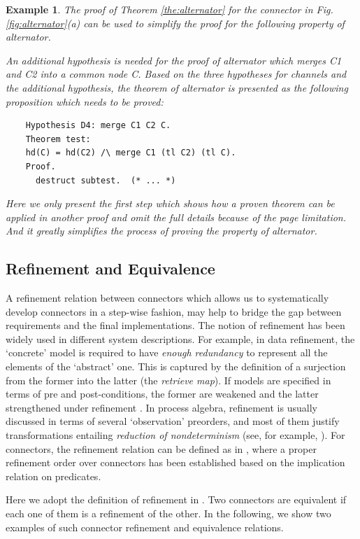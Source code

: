 \documentclass[3p,times]{elsarticle}
\newtheorem{example}{Example}[section]
\begin{document}
\begin{example}
The proof of Theorem \ref{the:alternator} for the connector in Fig. \ref{fig:alternator}(a) can be used to simplify the proof for the following
property of alternator.

An additional hypothesis is needed for the proof of alternator which merges \emph{C1} and \emph{C2} into a common node \emph{C}. Based on the three
hypotheses for channels and the additional hypothesis, the theorem of alternator is presented as the following proposition which needs to be proved:
\begin{verbatim}
    Hypothesis D4: merge C1 C2 C.
    Theorem test:
    hd(C) = hd(C2) /\ merge C1 (tl C2) (tl C).
    Proof.
      destruct subtest.  (* ... *)
\end{verbatim}
Here we only present the first step which shows how a proven theorem can be applied in another proof and omit the full details because of the page limitation.
And it greatly simplifies the process of proving the property of alternator.
\end{example}

\subsection{Refinement and Equivalence}

A refinement relation between connectors which allows us to systematically develop connectors in a step-wise fashion, may help to bridge
the gap between requirements and the final implementations. The notion of refinement has been widely used in different system descriptions.
For example, in data refinement\cite{RE98}, the `concrete' model is required to have \emph{enough redundancy} to represent all the elements
of the `abstract' one. This is captured by the definition of a surjection from the former into the latter (the \emph{retrieve map}). If
models are specified in terms of pre and post-conditions, the former are weakened and the latter strengthened under refinement \cite{Jon90}.
In process algebra, refinement is usually discussed in terms of several `observation' preorders, and most of them justify
transformations entailing \emph{reduction of nondeterminism} (see, for
example, \cite{Ros98}). For connectors, the refinement relation can be
defined as in \cite{SAA+12}, where a proper refinement order over
connectors has been established based on the implication relation on
predicates.

Here we adopt the definition of refinement in \cite{SAA+12}. Two connectors are equivalent if each one of them is a refinement of the other.
In the following, we show two examples of such connector refinement and equivalence relations.
\end{document}
